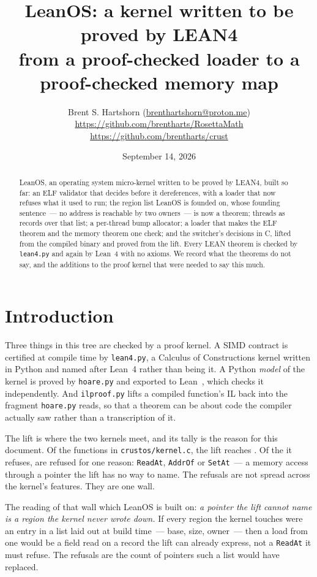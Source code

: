 \documentclass[11pt]{article}
\title{LeanOS: a kernel written to be proved by LEAN4\\
\large from a proof-checked loader to a proof-checked memory map}
\author{Brent S. Hartshorn \orcidlink{0009-0004-2853-655X}
        \small (\url{brenthartshorn@proton.me}) 
\\
\small
\url{https://github.com/brentharts/RosettaMath}
\quad
\url{https://github.com/brentharts/crust}
}
\date{September 14, 2026}
\begin{document}
\maketitle

\begin{abstract}
LeanOS, an operating system micro-kernel written to be proved by LEAN4,
built so far: an ELF validator that decides before it dereferences, with a loader
that now refuses what it used to run; the region list LeanOS is founded on,
whose founding sentence~--- no address is reachable by two owners~--- is now
a theorem; threads as records over that list; a per-thread bump allocator;
a loader that makes the ELF theorem and the memory theorem one check; and
the switcher's decisions in C, lifted from the compiled binary and proved
from the lift.  Every LEAN theorem is checked by \texttt{lean4.py} and again by
Lean~4 with no axioms.  We record what the theorems
do not say, and the additions to the proof kernel that were needed to say
this much.
\end{abstract}

\section{Introduction}

Three things in this tree are checked by a proof kernel.  A SIMD contract is
certified at compile time by \texttt{lean4.py}, a Calculus of Constructions
kernel written in Python and named after Lean~4 rather than being it.  A
Python \emph{model} of the kernel is proved by \texttt{hoare.py} and
exported to Lean~\leanVersion{}, which checks it independently.  And
\texttt{ilproof.py} lifts a compiled function's IL back into the fragment
\texttt{hoare.py} reads, so that a theorem can be about code the compiler
actually saw rather than a transcription of it.

The lift is where the two kernels meet, and its tally is the reason for
this document.  Of the \liftTotal{} functions in \texttt{crustos/kernel.c},
the lift reaches \liftReached{}.  Of the \liftRefused{} it refuses,
\liftMemory{} are refused for one reason: \texttt{ReadAt}, \texttt{AddrOf}
or \texttt{SetAt}~--- a memory access through a pointer the lift has no
way to name.  The refusals are not spread across the kernel's features.
They are one wall.

The reading of that wall which LeanOS is built on: \emph{a pointer the
lift cannot name is a region the kernel never wrote down.}  If every region
the kernel touches were an entry in a list laid out at build time~--- base,
size, owner~--- then a load from one would be a field read on a record the
lift can already express, not a \texttt{ReadAt} it must refuse.  The
\liftMemory{} refusals are the count of pointers such a list would have
replaced.
\end{document}
